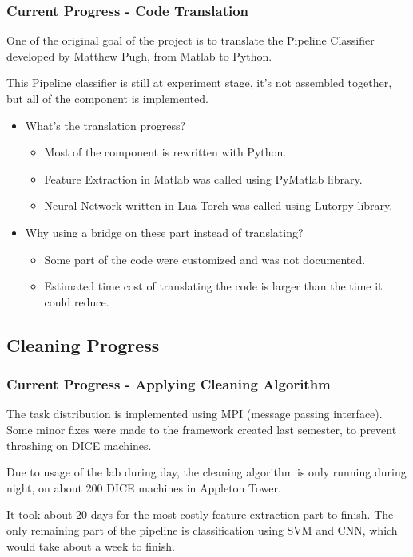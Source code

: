 \documentclass{beamer}[fullspacing]
\begin{document}
\begin{frame}
\frametitle{Current Progress - Code Translation}

One of the original goal of the project is to translate the Pipeline Classifier developed by Matthew Pugh, from Matlab to Python.

This Pipeline classifier is still at experiment stage, it's not assembled together, but all of the component is implemented.

\begin{itemize}
\item What's the translation progress?
\begin{itemize}
\item Most of the component is rewritten with Python.
\item Feature Extraction in Matlab was called using PyMatlab library.
\item Neural Network written in Lua Torch was called using Lutorpy library.
\end{itemize}
\item Why using a bridge on these part instead of translating?
\begin{itemize}
\item Some part of the code were customized and was not documented.
\item Estimated time cost of translating the code is larger than the time it could reduce.
\end{itemize}
\end{itemize}

\end{frame}

\subsection{Cleaning Progress}
\begin{frame}
\frametitle{Current Progress - Applying Cleaning Algorithm}
The task distribution is implemented using MPI (message passing interface). Some minor fixes were made to the framework created last semester, to prevent thrashing on DICE machines.

Due to usage of the lab during day, the cleaning algorithm is only running during night, on about 200 DICE machines in Appleton Tower. 

It took about 20 days for the most costly feature extraction part to finish. The only remaining part of the pipeline is classification using SVM and CNN, which would take about a week to finish.

\end{frame}
\end{document}
